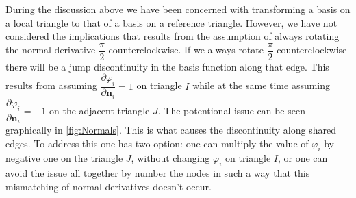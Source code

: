 During the discussion above we have been concerned with transforming a basis on
a local triangle to that of a basis on a reference triangle. However, we have
not considered the implications that results from the assumption of always
rotating the normal derivative $\dfrac{\pi}{2}$ counterclockwise.  If we always
rotate $\dfrac{\pi}{2}$ counterclockwise there will be a jump discontinuity in
the basis function along that edge.  This results from assuming
$\dfrac{\partial\varphi_i}{\partial\mathbf{n}_i} = 1$ on triangle $I$ while at
the same time assuming $\dfrac{\partial\varphi_i}{\partial\mathbf{n}_i} = -1$ on
the adjacent triangle $J$. The potentional issue can be seen graphically in
\autoref{fig:Normals}. This is what causes the discontinuity along shared edges.
To address this one has two option: one can multiply the value of $\varphi_i$ by
negative one on the triangle $J$, without changing $\varphi_i$ on triangle
$I$, or one can avoid the issue all together by number the nodes in such a way
that this mismatching of normal derivatives doesn't occur.




